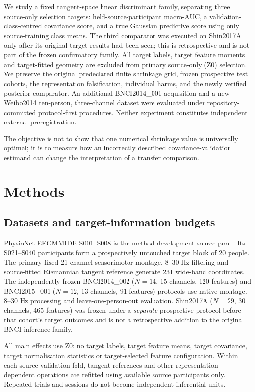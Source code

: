 \documentclass[11pt,a4paper]{article}
\begin{document}
We study a fixed tangent-space linear discriminant family, separating
three source-only selection targets: held-source-participant
macro-AUC, a validation-class-centred covariance score, and a true
Gaussian predictive score using only source-training class means.
The third comparator was executed on Shin2017A only after its original
target results had been seen; this is retrospective and is not part of
the frozen confirmatory family. All target labels, target feature
moments and target-fitted geometry are excluded from primary source-only
(Z0) selection. We preserve the original predeclared finite shrinkage grid,
frozen prospective test cohorts, the representation falsification,
individual harms, and the newly verified posterior comparator. An additional BNCI2014\_001 acquisition and a new Weibo2014
ten-person, three-channel dataset were evaluated under
repository-committed protocol-first procedures. Neither experiment
constitutes independent external preregistration.

The objective is not to show
that one numerical shrinkage value is universally optimal; it is to measure
how an incorrectly described covariance-validation estimand can change
the interpretation of a transfer comparison.



\section{Methods}
\subsection{Datasets and target-information budgets}
PhysioNet EEGMMIDB S001--S008 is the method-development source pool
\cite{schalk2009eegmmidb,schalk2004bci2000}.
Its S021--S040 participants form a prospectively untouched target block
of 20 people. The primary fixed 21-channel sensorimotor montage, 8--30 Hz
filtering and source-fitted Riemannian tangent reference generate 231
wide-band coordinates. The independently frozen BNCI2014\_002
(\(N=14\), 15 channels, 120 features) and BNCI2015\_001
(\(N=12\), 13 channels, 91 features) protocols use native montage,
8--30 Hz processing and leave-one-person-out evaluation. Shin2017A
(\(N=29\), 30 channels, 465 features) was frozen under a \emph{separate}
prospective protocol before that cohort's target outcomes and is not a
retrospective addition to the original BNCI inference family.

All main effects use Z0: no target labels, target feature means, target
covariance, target normalisation statistics or target-selected feature
configuration. Within each source-validation fold, tangent references and
other representation-dependent operations are refitted using available
source participants only. Repeated trials and sessions do not become
independent inferential units.
\end{document}
